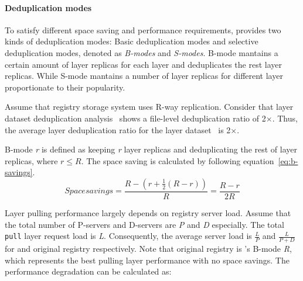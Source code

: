 \paragraph{Deduplication modes}
\label{sec:dedup-mode}

To satisfy different space saving and performance requirements,
\sysname provides two kinds of deduplication modes:
Basic deduplication modes and selective deduplication modes, denoted as \emph{B-modes} and \emph{S-modes}.
B-mode mantains a certain amount of layer replicas for each layer and deduplicates the rest layer replicas.
While S-mode mantains a number of layer replicas for different layer proportionate to their popularity.

Assume that registry storage system uses R-way replication.
Consider that layer dataset deduplication analysis~\cite{xxx} shows a file-level deduplication ratio of 2$\times$.
Thus, the average layer deduplication ratio for the layer dataset~\cite{xxx} is 2$\times$.

B-mode \emph{r} is defined as keeping \emph{r} layer replicas and deduplicating the rest of layer replicas, where $r \leq R$. 
The space saving is calculated by following equation~\ref{eq:b-savings}.
\begin{equation}\label{eq:b-savings}
Space savings = \frac{R-(r+\frac{1}{2}(R-r))}{R} = \frac{R-r}{2R}
\end{equation}


Layer pulling performance largely depends on registry server load.
Assume that the total number of P-servers and D-servers are \emph{P} and \emph{D} especially.
The total \texttt{pull} layer request load is \emph{L}.
Consequently, the average server load is $\frac{L}{P}$ and $\frac{L}{P+D}$ for \sysname and original registry respectively.
Note that original registry is \sysname's B-mode \emph{R}, which represents the best pulling layer performance with no space savings.
The performance degradation can be calculated as:
 
